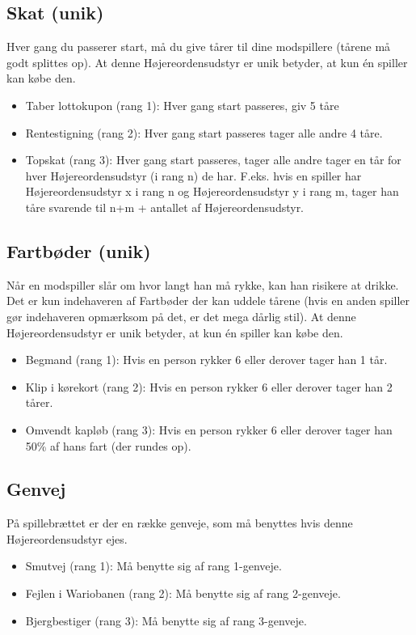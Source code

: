 \documentclass{article}
\begin{document}
\subsection{Skat (unik)}
Hver gang du passerer start, må du give tårer til dine modspillere (tårene må godt splittes op). At denne Højereordensudstyr er unik betyder, at kun én spiller kan købe den.

\begin{itemize}
	\item Taber lottokupon (rang 1): Hver gang start passeres, giv 5 tåre
	\item Rentestigning (rang 2): Hver gang start passeres tager alle andre 4 tåre.
	\item Topskat (rang 3): Hver gang start passeres, tager alle andre tager en tår for hver Højereordensudstyr (i rang n) de har. F.eks. hvis en spiller har Højereordensudstyr x i rang n og Højereordensudstyr y i rang m, tager han tåre svarende til n+m + antallet af Højereordensudstyr.
\end{itemize}
 
\subsection{Fartbøder (unik)}
Når en modspiller slår om hvor langt han må rykke, kan han risikere at drikke. Det er kun indehaveren af Fartbøder der kan uddele tårene (hvis en anden spiller gør indehaveren opmærksom på det, er det mega dårlig stil). At denne Højereordensudstyr er unik betyder, at kun én spiller kan købe den. 
 
\begin{itemize}
	\item Begmand (rang 1): Hvis en person rykker 6 eller derover tager han 1 tår.
	\item Klip i kørekort (rang 2): Hvis en person rykker 6 eller derover tager han 2 tårer.
	\item Omvendt kapløb (rang 3): Hvis en person rykker 6 eller derover tager han 50\% af hans fart (der rundes op).
\end{itemize}

\subsection{Genvej}
På spillebrættet er der en række genveje, som må benyttes hvis denne Højereordensudstyr ejes. 

\begin{itemize}
	\item Smutvej (rang 1): Må benytte sig af rang 1-genveje.
	\item Fejlen i Wariobanen (rang 2): Må benytte sig af rang 2-genveje.
	\item Bjergbestiger (rang 3): Må benytte sig af rang 3-genveje.
\end{itemize}
 
\end{document}
